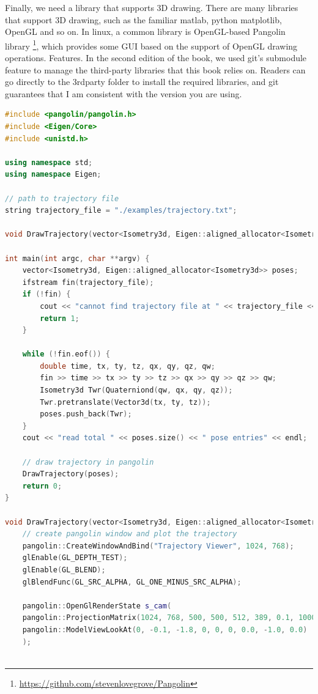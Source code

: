 Finally, we need a library that supports 3D drawing. There are many libraries that support 3D drawing, such as the familiar matlab, python matplotlib, OpenGL and so on. In linux, a common library is OpenGL-based Pangolin library \footnote { \url {https://github.com/stevenlovegrove/Pangolin}}, which provides some GUI based on the support of OpenGL drawing operations. Features. In the second edition of the book, we used git's submodule feature to manage the third-party libraries that this book relies on. Readers can go directly to the 3rdparty folder to install the required libraries, and git guarantees that I am consistent with the version you are using.

\begin{lstlisting}[language=c++,caption=slambook2/ch3/examples/plotTrajectory.cpp]
#include <pangolin/pangolin.h>
#include <Eigen/Core>
#include <unistd.h>

using namespace std;
using namespace Eigen;

// path to trajectory file
string trajectory_file = "./examples/trajectory.txt";

void DrawTrajectory(vector<Isometry3d, Eigen::aligned_allocator<Isometry3d>>);

int main(int argc, char **argv) {
    vector<Isometry3d, Eigen::aligned_allocator<Isometry3d>> poses;
    ifstream fin(trajectory_file);
    if (!fin) {
        cout << "cannot find trajectory file at " << trajectory_file << endl;
        return 1;
    }
    
    while (!fin.eof()) {
        double time, tx, ty, tz, qx, qy, qz, qw;
        fin >> time >> tx >> ty >> tz >> qx >> qy >> qz >> qw;
        Isometry3d Twr(Quaterniond(qw, qx, qy, qz));
        Twr.pretranslate(Vector3d(tx, ty, tz));
        poses.push_back(Twr);
    }
    cout << "read total " << poses.size() << " pose entries" << endl;
    
    // draw trajectory in pangolin
    DrawTrajectory(poses);
    return 0;
}

void DrawTrajectory(vector<Isometry3d, Eigen::aligned_allocator<Isometry3d>> poses) {
    // create pangolin window and plot the trajectory
    pangolin::CreateWindowAndBind("Trajectory Viewer", 1024, 768);
    glEnable(GL_DEPTH_TEST);
    glEnable(GL_BLEND);
    glBlendFunc(GL_SRC_ALPHA, GL_ONE_MINUS_SRC_ALPHA);
    
    pangolin::OpenGlRenderState s_cam(
    pangolin::ProjectionMatrix(1024, 768, 500, 500, 512, 389, 0.1, 1000),
    pangolin::ModelViewLookAt(0, -0.1, -1.8, 0, 0, 0, 0.0, -1.0, 0.0)
    );
    

\end{lstlisting}
